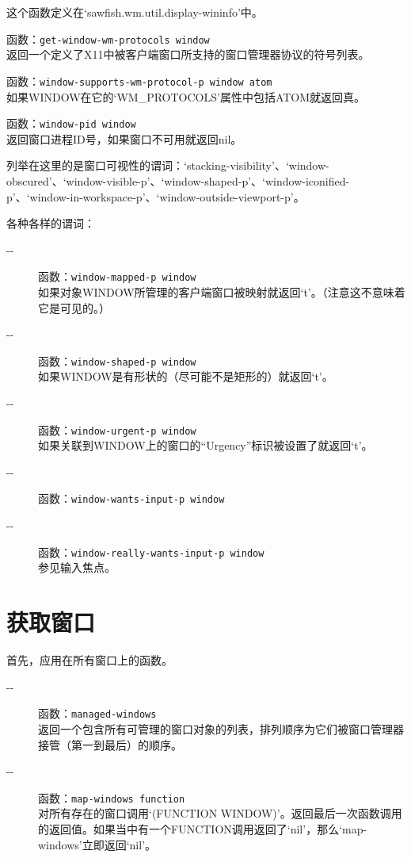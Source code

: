 \documentclass{book}
\begin{document}
\begin{CJK*}{UTF8}{gbsn}
\begin{description}
这个函数定义在`sawfish.wm.util.display-wininfo'中。
\item[-{}-] 函数：\verb|get-window-wm-protocols window|\\
返回一个定义了X11中被客户端窗口所支持的窗口管理器协议的符号列表。
\item[-{}-] 函数：\verb|window-supports-wm-protocol-p window atom|\\
如果WINDOW在它的`WM\_PROTOCOLS'属性中包括ATOM就返回真。
\item[-{}-] 函数：\verb|window-pid window|\\
返回窗口进程ID号，如果窗口不可用就返回nil。
\end{description}
列举在这里的是窗口可视性的谓词：`stacking-visibility'、`window-obscured'、`window-visible-p'、`window-shaped-p'、`window-iconified-p'、`window-in-workspace-p'、`window-outside-viewport-p'。

各种各样的谓词：
\begin{description}
\item[-{}-] 函数：\verb|window-mapped-p window|\\
如果对象WINDOW所管理的客户端窗口被映射就返回`t'。（注意这不意味着它是可见的。）
\item[-{}-] 函数：\verb|window-shaped-p window|\\
如果WINDOW是有形状的（尽可能不是矩形的）就返回`t'。
\item[-{}-] 函数：\verb|window-urgent-p window|\\
如果关联到WINDOW上的窗口的``Urgency''标识被设置了就返回`t'。
\item[-{}-] 函数：\verb|window-wants-input-p window|\\
\item[-{}-] 函数：\verb|window-really-wants-input-p window|\\
参见输入焦点。
\end{description}
\section{获取窗口}
首先，应用在所有窗口上的函数。
\begin{description}
\item[-{}-] 函数：\verb|managed-windows|\\
返回一个包含所有可管理的窗口对象的列表，排列顺序为它们被窗口管理器接管（第一到最后）的顺序。
\item[-{}-] 函数：\verb|map-windows function|\\
对所有存在的窗口调用`(FUNCTION WINDOW)'。返回最后一次函数调用的返回值。如果当中有一个FUNCTION调用返回了`nil'，那么`map-windows'立即返回`nil'。
\end{description}


\end{CJK*}
\end{document}
